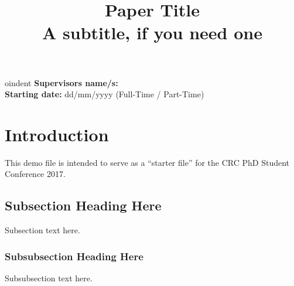 \documentclass[10pt, conference,a4paper]{IEEEtran}
\begin{document}
%
\title{Paper Title \\ \vspace{0.3\baselineskip} \Large{A subtitle, if you need one}} %

\author{ 
}

\maketitle


oindent
\textbf{Supervisors name/s:}\\
\textbf{Starting date:} dd/mm/yyyy (Full-Time / Part-Time)



\section{Introduction}
This demo file is intended to serve as a ``starter file''
for the CRC PhD Student Conference 2017.


\subsection{Subsection Heading Here}
Subsection text here.


\subsubsection{Subsubsection Heading Here}
Subsubsection text here.


%
%
\end{document}
